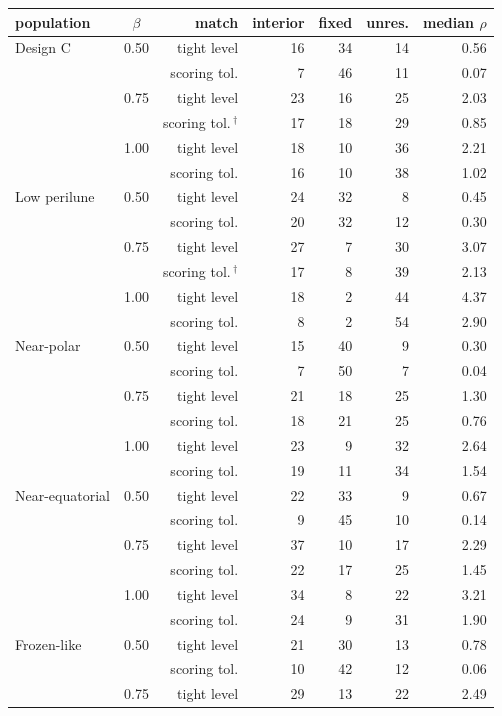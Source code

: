\begin{tabular}{@{}l c r r r r r@{}}
\toprule
population & $\beta$ & match & interior & fixed & unres. & median $\rho$ \\
\midrule
Design C & 0.50 & tight level & 16 & 34 & 14 & 0.56 \\
 &  & scoring tol. & 7 & 46 & 11 & 0.07 \\
 & 0.75 & tight level & 23 & 16 & 25 & 2.03 \\
 &  & scoring tol.\,$^{\dagger}$ & 17 & 18 & 29 & 0.85 \\
 & 1.00 & tight level & 18 & 10 & 36 & 2.21 \\
 &  & scoring tol. & 16 & 10 & 38 & 1.02 \\
\midrule
Low perilune & 0.50 & tight level & 24 & 32 & 8 & 0.45 \\
 &  & scoring tol. & 20 & 32 & 12 & 0.30 \\
 & 0.75 & tight level & 27 & 7 & 30 & 3.07 \\
 &  & scoring tol.\,$^{\dagger}$ & 17 & 8 & 39 & 2.13 \\
 & 1.00 & tight level & 18 & 2 & 44 & 4.37 \\
 &  & scoring tol. & 8 & 2 & 54 & 2.90 \\
\midrule
Near-polar & 0.50 & tight level & 15 & 40 & 9 & 0.30 \\
 &  & scoring tol. & 7 & 50 & 7 & 0.04 \\
 & 0.75 & tight level & 21 & 18 & 25 & 1.30 \\
 &  & scoring tol. & 18 & 21 & 25 & 0.76 \\
 & 1.00 & tight level & 23 & 9 & 32 & 2.64 \\
 &  & scoring tol. & 19 & 11 & 34 & 1.54 \\
\midrule
Near-equatorial & 0.50 & tight level & 22 & 33 & 9 & 0.67 \\
 &  & scoring tol. & 9 & 45 & 10 & 0.14 \\
 & 0.75 & tight level & 37 & 10 & 17 & 2.29 \\
 &  & scoring tol. & 22 & 17 & 25 & 1.45 \\
 & 1.00 & tight level & 34 & 8 & 22 & 3.21 \\
 &  & scoring tol. & 24 & 9 & 31 & 1.90 \\
\midrule
Frozen-like & 0.50 & tight level & 21 & 30 & 13 & 0.78 \\
 &  & scoring tol. & 10 & 42 & 12 & 0.06 \\
 & 0.75 & tight level & 29 & 13 & 22 & 2.49 \\

\end{tabular}
